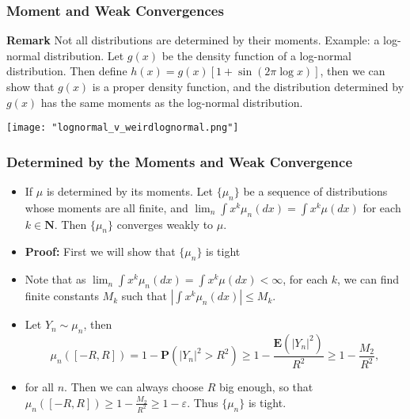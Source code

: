 \documentclass[handout]{beamer}
\newcommand{\BP}{\mathbf{P}}
\newcommand{\BE}{\mathbf{E}}
\begin{document}
\frame
{
  \frametitle{Moment and Weak Convergences}


\textbf{Remark} Not all distributions are determined by their moments. Example: a log-normal distribution. Let $g(x)$ be the density function of a log-normal distribution. Then define $h(x)=g(x) [1+\sin (2\pi \log x)]$, then we can show that $g(x)$ is a proper density function, and the distribution determined by $g(x)$ has the same moments as the log-normal distribution. 

\texttt{[image: "lognormal\_v\_weirdlognormal.png"]}

 }



   \frame
{
  \frametitle{Determined by the Moments and Weak Convergence}

 \begin{itemize}

\item<1->[]\begin{Theorem}[11.4.1]If $\mu$ is determined by its moments. Let $\{\mu_n\}$ be a sequence of distributions whose moments are all finite, and $\lim_n \int x^k \mu_n(dx)=\int x^k \mu(dx)$ for each $k\in \mathbf{N}$. Then $\{\mu_n\}$ converges weakly to $\mu$. 
\end{Theorem}

\item<2-> \textbf{Proof:} First we will show that $\{\mu_n\}$ is tight

\item<3->[-] Note that as $\lim_n \int x^k \mu_n(dx)=\int x^k \mu(dx)<\infty$, for each $k$, we can find finite constants $M_k$ such that $|\int x^k \mu_n(dx)| \leq M_k$. 

\item<4->[-] Let $Y_n\sim \mu_n$, then 
$$\mu_n([-R, R])=1-\BP(|Y_n|^2>R^2)\geq 1-\frac{\BE(|Y_n|^2)}{R^2}\geq 1-\frac{M_2}{R^2},$$

\item<5-> for all $n$. Then we can always choose $R$ big enough, so that $\mu_n([-R, R])\geq 1-\frac{M_2}{R^2}\geq 1-\varepsilon$. Thus $\{\mu_n\}$ is tight.


\end{itemize}
 }
\end{document}
